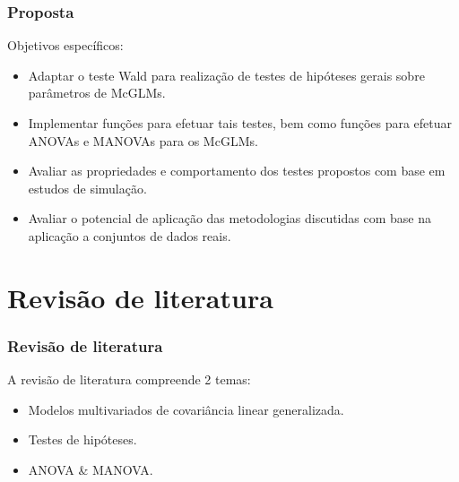 \documentclass[10pt,
  aspectratio=169,
  serif,
  mathserif,
  professionalfont,
  compress,
  handout,
  ]{beamer}\usepackage[]{graphicx}\usepackage[]{color}
\begin{document}

\begin{frame}
  \frametitle{Proposta}

Objetivos específicos: 

  \begin{itemize}
    \itemsep 2ex

  \item Adaptar o teste Wald para realização de testes de hipóteses gerais sobre parâmetros de McGLMs. 
  
  \item Implementar funções para efetuar tais testes, bem como funções para efetuar ANOVAs e MANOVAs para os McGLMs. 

  \item Avaliar as propriedades e comportamento dos testes propostos com base em estudos de simulação.

  \item Avaliar o potencial de aplicação das metodologias discutidas com base na aplicação a conjuntos de dados reais.

  \end{itemize}

\end{frame}


\section{Revisão de literatura}


\begin{frame}
  \frametitle{Revisão de literatura}
  
  A revisão de literatura compreende 2 temas:
  
  \begin{itemize}
    \itemsep 2ex
  \item Modelos multivariados de covariância linear generalizada. 
  \item Testes de hipóteses.
  \item ANOVA \& MANOVA.
  \end{itemize}
\end{frame}

\end{document}
